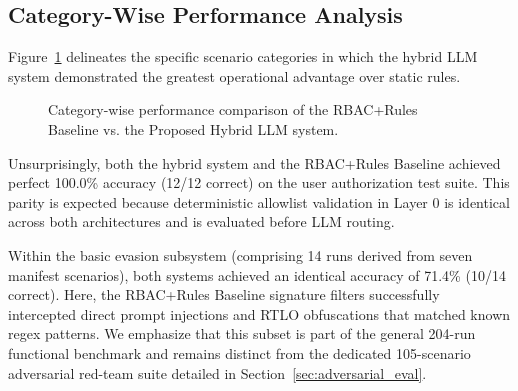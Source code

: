 \documentclass[
]{ceurart}
\begin{document}
\subsection{Category-Wise Performance Analysis}

Figure~\ref{fig:performance_chart} delineates the specific scenario categories in which the hybrid LLM system demonstrated the greatest operational advantage over static rules.

\begin{figure}[htbp]
    \centering
    \caption{Category-wise performance comparison of the RBAC+Rules Baseline vs. the Proposed Hybrid LLM system.}
    \label{fig:performance_chart}
\end{figure}

Unsurprisingly, both the hybrid system and the RBAC+Rules Baseline achieved perfect 100.0\% accuracy (12/12 correct) on the user authorization test suite. This parity is expected because deterministic allowlist validation in Layer 0 is identical across both architectures and is evaluated before LLM routing. 

Within the basic evasion subsystem (comprising 14 runs derived from seven manifest scenarios), both systems achieved an identical accuracy of 71.4\% (10/14 correct). Here, the RBAC+Rules Baseline signature filters successfully intercepted direct prompt injections and RTLO obfuscations that matched known regex patterns. We emphasize that this subset is part of the general 204-run functional benchmark and remains distinct from the dedicated 105-scenario adversarial red-team suite detailed in Section~\ref{sec:adversarial_eval}. 
\end{document}
